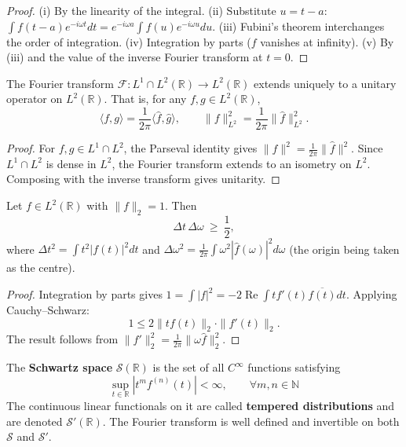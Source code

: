 \begin{proof}
(i) By the linearity of the integral. (ii) Substitute $u = t - a$: $\int f(t-a)e^{-i\omega t}dt = e^{-i\omega a}\int f(u)e^{-i\omega u}du$. (iii) Fubini's theorem interchanges the order of integration. (iv) Integration by parts ($f$ vanishes at infinity). (v) By (iii) and the value of the inverse Fourier transform at $t=0$.
\end{proof}

\begin{theorem}\label{thm:plancherel}
The Fourier transform $\mathcal{F}:L^1\cap L^2(\mathbb{R})\to L^2(\mathbb{R})$ extends uniquely to a unitary operator on $L^2(\mathbb{R})$. That is, for any $f,g\in L^2(\mathbb{R})$,
\[
\langle f,g\rangle = \frac{1}{2\pi}\langle \hat{f},\hat{g}\rangle,\qquad
\|f\|_{L^2}^2 = \frac{1}{2\pi}\|\hat f\|_{L^2}^2.
\]
\end{theorem}

\begin{proof}
For $f,g\in L^1\cap L^2$, the Parseval identity gives $\|f\|^2=\frac{1}{2\pi}\|\hat f\|^2$. Since $L^1\cap L^2$ is dense in $L^2$, the Fourier transform extends to an isometry on $L^2$. Composing with the inverse transform gives unitarity.
\end{proof}

\begin{theorem}\label{thm:uncertainty}
Let $f\in L^2(\mathbb{R})$ with $\|f\|_2=1$. Then
\[
\Delta t\,\Delta\omega\ \ge\ \frac12,
\]
where $\Delta t^2=\int t^2|f(t)|^2dt$ and $\Delta\omega^2=\frac{1}{2\pi}\int\omega^2|\hat f(\omega)|^2d\omega$ (the origin being taken as the centre).
\end{theorem}

\begin{proof}
Integration by parts gives $1=\int|f|^2 = -2\operatorname{Re}\int t f'(t)\overline{f(t)}dt$. Applying Cauchy--Schwarz:
\[
1\le 2\|tf(t)\|_2\cdot\|f'(t)\|_2.
\]
The result follows from $\|f'\|_2^2=\frac{1}{2\pi}\|\omega\hat f\|_2^2$.
\end{proof}

\begin{definition}\label{def:schwartz}
The \textbf{Schwartz space} $\mathcal{S}(\mathbb{R})$ is the set of all $C^\infty$ functions satisfying
\[
\sup_{t\in\mathbb{R}}|t^m f^{(n)}(t)|<\infty,\qquad \forall m,n\in\mathbb{N}
\]
The continuous linear functionals on it are called \textbf{tempered distributions} and are denoted $\mathcal{S}'(\mathbb{R})$. The Fourier transform is well defined and invertible on both $\mathcal{S}$ and $\mathcal{S}'$.
\end{definition}

